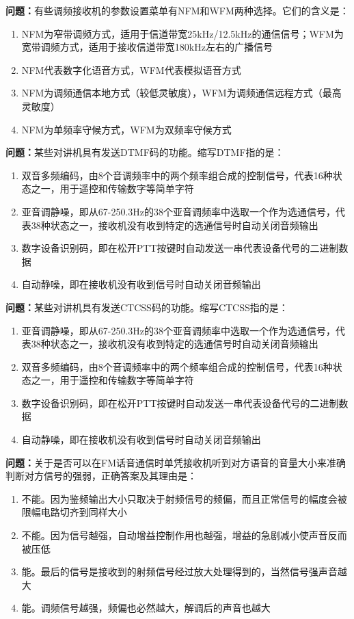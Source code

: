 \documentclass{ctexbook}
\begin{document}
\textbf{问题：}有些调频接收机的参数设置菜单有NFM和WFM两种选择。它们的含义是：
\begin{enumerate}[label=\Alph*), leftmargin=3em]
\item NFM为窄带调频方式，适用于信道带宽25kHz/12.5kHz的通信信号；WFM为宽带调频方式，适用于接收信道带宽180kHz左右的广播信号
\item NFM代表数字化语音方式，WFM代表模拟语音方式
\item NFM为调频通信本地方式（较低灵敏度），WFM为调频通信远程方式（最高灵敏度）
\item NFM为单频率守候方式，WFM为双频率守候方式
\end{enumerate}

\textbf{问题：}某些对讲机具有发送DTMF码的功能。缩写DTMF指的是：
\begin{enumerate}[label=\Alph*), leftmargin=3em]
\item 双音多频编码，由8个音调频率中的两个频率组合成的控制信号，代表16种状态之一，用于遥控和传输数字等简单字符
\item 亚音调静噪，即从67-250.3Hz的38个亚音调频率中选取一个作为选通信号，代表38种状态之一，接收机没有收到特定的选通信号时自动关闭音频输出
\item 数字设备识别码，即在松开PTT按键时自动发送一串代表设备代号的二进制数据
\item 自动静噪，即在接收机没有收到信号时自动关闭音频输出
\end{enumerate}

\textbf{问题：}某些对讲机具有发送CTCSS码的功能。缩写CTCSS指的是：
\begin{enumerate}[label=\Alph*), leftmargin=3em]
\item 亚音调静噪，即从67-250.3Hz的38个亚音调频率中选取一个作为选通信号，代表38种状态之一，接收机没有收到特定的选通信号时自动关闭音频输出
\item 双音多频编码，由8个音调频率中的两个频率组合成的控制信号，代表16种状态之一，用于遥控和传输数字等简单字符
\item 数字设备识别码，即在松开PTT按键时自动发送一串代表设备代号的二进制数据
\item 自动静噪，即在接收机没有收到信号时自动关闭音频输出
\end{enumerate}

\textbf{问题：}关于是否可以在FM话音通信时单凭接收机听到对方语音的音量大小来准确判断对方信号的强弱，正确答案及其理由是：
\begin{enumerate}[label=\Alph*), leftmargin=3em]
\item 不能。因为鉴频输出大小只取决于射频信号的频偏，而且正常信号的幅度会被限幅电路切齐到同样大小
\item 不能。因为信号越强，自动增益控制作用也越强，增益的急剧减小使声音反而被压低
\item 能。最后的信号是接收到的射频信号经过放大处理得到的，当然信号强声音越大
\item 能。调频信号越强，频偏也必然越大，解调后的声音也越大
\end{enumerate}
\end{document}
